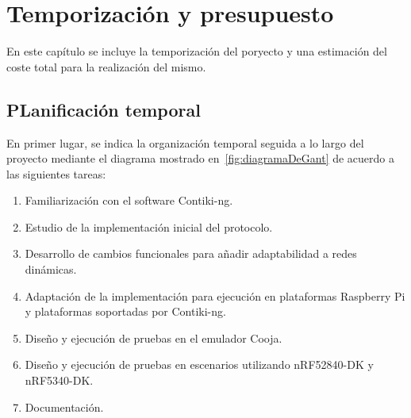 %
%
%
% 
%
%
%
%

\chapter{Temporización y presupuesto}\label{cha:temp_pres}

En este capítulo se incluye la temporización del poryecto y una estimación del coste total para la realización del mismo.


\section{PLanificación temporal}\label{sec:plan_temp}

En primer lugar, se indica la organización temporal seguida a lo largo del proyecto mediante el diagrama mostrado en~\ref{fig:diagramaDeGant} de acuerdo a las siguientes tareas:

\begin{enumerate}
    \item Familiarización con el software Contiki-ng.
    \item Estudio de la implementación inicial del protocolo.
    \item Desarrollo de cambios funcionales para añadir adaptabilidad a redes dinámicas.
    \item Adaptación de la implementación para ejecución en plataformas Raspberry Pi y plataformas soportadas por Contiki-ng.
    \item Diseño y ejecución de pruebas en el emulador Cooja.
    \item Diseño y ejecución de pruebas en escenarios utilizando nRF52840-DK y nRF5340-DK.
    \item Documentación.
\end{enumerate}
    

